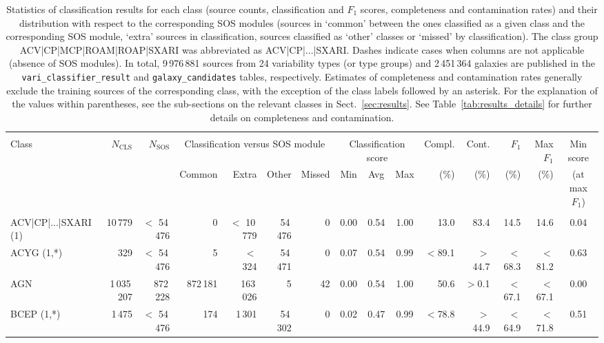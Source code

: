 \documentclass[longauth]{aa}
\begin{document}
\begin{landscape}
\begin{table}  
\caption[Classification result statistics]{Statistics of classification results for each class (source counts, classification and $F_1$ scores, completeness and contamination rates) and their distribution with respect to the corresponding SOS modules (sources in `common' between the ones classified as a given class and the corresponding SOS module, `extra' sources in classification, sources classified as `other' classes or `missed' by classification). The class group ACV|CP|MCP|ROAM|ROAP|SXARI was abbreviated as ACV|CP|...|SXARI. Dashes indicate cases when columns are not applicable (absence of SOS modules). 
In total, 9\,976\,881 sources from 24 variability types (or type groups) and 2\,451\,364 galaxies are published in the \texttt{vari\_classifier\_result} and \texttt{galaxy\_candidates} tables, respectively. Estimates of completeness and contamination rates generally exclude the training sources of the corresponding class, with the exception of the class labels followed by an asterisk. For the explanation of the values within parentheses, see the sub-sections on the relevant classes in Sect.~\ref{sec:results}. See Table~\ref{tab:results_details} for further details on completeness and contamination.\label{tab:results}} 
\centering                  
\begin{tabular}{@{}lrrrrrrcccrrrrc@{}}     
\hline\hline & \\[-2.0ex]                 
\multirow{2}{*}{Class} & \multirow{2}{*}{$N_{\mathrm{CLS}}$} & \multirow{2}{*}{$N_{\mathrm{SOS}}$} & \multicolumn{4}{c}{Classification versus SOS module} &
   \multicolumn{3}{c}{Classification score} & Compl. & Cont. & $F_1$ & Max $F_1$ & Min score\\
 & & & Common & Extra & Other & Missed & Min & Avg & Max & (\%) & (\%) & (\%) & (\%) & (at max $F_1$) \\  
\hline & \\[-1.5ex]
ACV|CP|...|SXARI (1) & 10\,779 & $<$ 54\,476 & 0 & $<$ 10\,779 & 54\,476 & 0 & 0.00 & 0.54 & 1.00 & 13.0 & 83.4 & 14.5 & 14.6 & 0.04 \\
ACYG (1,*) & 329 & $<$ 54\,476 & 5 & $<$ 324 & 54\,471 & 0 & 0.07 & 0.54 & 0.99 & $<$89.1 & $>$44.7 & $<$68.3 & $<$81.2 & 0.63 \\
AGN & 1\,035\,207 & 872\,228 & 872\,181 & 163\,026 & 5 & 42 & 0.00 & 0.54 & 1.00 & 50.6 & $>$0.1 & $<$67.1 & $<$67.1 & 0.00 \\
BCEP (1,*) & 1\,475 & $<$ 54\,476 & 174 & 1\,301 & 54\,302 & 0 & 0.02 & 0.47 & 0.99 & $<$78.8 & $>$44.9 & $<$64.9 & $<$71.8 & 0.51 \\

\end{tabular}
\end{table}
\end{landscape}
\end{document}
